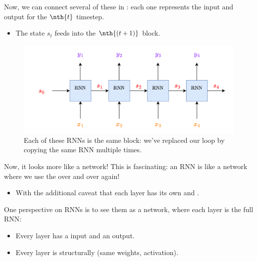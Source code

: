         Now, we can connect several of these in : each one represents the input and output for the $\nth{t}$ timestep. 

        \begin{itemize}
            \item The state $s_t$ feeds into the $\nth{(t+1)}$ block.
        \end{itemize}

        \begin{figure}[H]
            \centering
            \includegraphics[width=150mm]{images/rnn_images/rnn_simple_layers.png}
            \caption*{Each of these RNNs is the same block: we've replaced our loop by copying the same RNN multiple times.}
        \end{figure}

        Now, it looks more like a network! This is fascinating: an RNN is like a network where we use the  over and over again!

        \begin{itemize}
            \item With the additional caveat that each layer has its own  and .\\
        \end{itemize}

        \begin{concept}
            One perspective on RNNs is to see them as a  network, where each layer is the full RNN:

            \begin{itemize}
                \item Every layer has a  input and an output.
                \item Every layer is structurally  (same weights, activation).
            \end{itemize}
        \end{concept}

